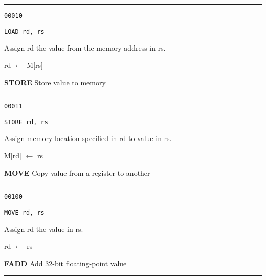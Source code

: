 \documentclass{article}
\begin{document}
\kern-3pt
\noindent\rule{16.5cm}{0.4pt}
\normalsize

{\large
	 \texttt{00010} \par
	\smallbreak
	 \texttt{LOAD rd, rs} \par
	\smallbreak
	 Assign rd the value from the memory address in rs. \par
	\smallbreak
	 rd $\leftarrow$ M[rs] \par
}

\bigskip\bigskip

\flushleft
\LARGE\textbf{STORE} \large \hfill Store value to memory

\kern-3pt
\noindent\rule{16.5cm}{0.4pt}
\normalsize

{\large
	 \texttt{00011} \par
	\smallbreak
	 \texttt{STORE rd, rs} \par
	\smallbreak
	 Assign memory location specified in rd to value in rs. \par
	\smallbreak
	 M[rd] $\leftarrow$ rs \par
}

\bigskip\bigskip

\flushleft
\LARGE\textbf{MOVE} \large \hfill Copy value from a register to another

\kern-3pt
\noindent\rule{16.5cm}{0.4pt}
\normalsize

{\large
	 \texttt{00100} \par
	\smallbreak
	 \texttt{MOVE rd, rs} \par
	\smallbreak
	 Assign rd the value in rs. \par
	\smallbreak
	 rd $\leftarrow$ rs \par
}

\pagebreak

\flushleft
\LARGE\textbf{FADD} \large \hfill Add 32-bit floating-point value

\kern-3pt
\noindent\rule{16.5cm}{0.4pt}
\normalsize
\end{document}
